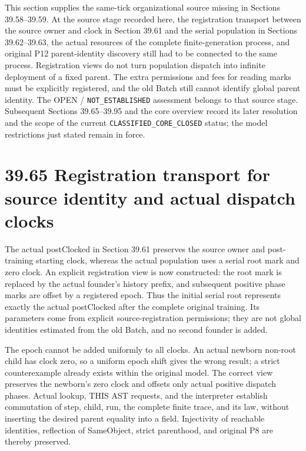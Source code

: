 \documentclass[
  english,
  11pt,
  oneside]{book}
\begin{document}
This section supplies the same-tick organizational source missing in Sections 39.58--39.59. At the source stage recorded here, the registration transport between the source owner and clock in Section 39.61 and the serial population in Sections 39.62--39.63, the actual resources of the complete finite-generation process, and original P12 parent-identity discovery still had to be connected to the same process. Registration views do not turn population dispatch into infinite deployment of a fixed parent. The extra permissions and fees for reading marks must be explicitly registered, and the old Batch still cannot identify global parent identity. The OPEN / \nolinkurl{NOT_ESTABLISHED} assessment belongs to that source stage. Subsequent Sections 39.65--39.95 and the core overview record its later resolution and the scope of the current \nolinkurl{CLASSIFIED_CORE_CLOSED} status; the model restrictions just stated remain in force.

\section{39.65 Registration transport for source identity and actual dispatch clocks}\label{registration-transport-for-source-identity-and-actual-dispatch-clocks}

The actual postClocked in Section 39.61 preserves the source owner and post-training starting clock, whereas the actual population uses a serial root mark and zero clock. An explicit registration view is now constructed: the root mark is replaced by the actual founder's history prefix, and subsequent positive phase marks are offset by a registered epoch. Thus the initial serial root represents exactly the actual postClocked after the complete original training. Its parameters come from explicit source-registration permissions; they are not global identities estimated from the old Batch, and no second founder is added.

The epoch cannot be added uniformly to all clocks. An actual newborn non-root child has clock zero, so a uniform epoch shift gives the wrong result; a strict counterexample already exists within the original model. The correct view preserves the newborn's zero clock and offsets only actual positive dispatch phases. Actual lookup, THIS AST requests, and the interpreter establish commutation of step, child, run, the complete finite trace, and its law, without inserting the desired parent equality into a field. Injectivity of reachable identities, reflection of SameObject, strict parenthood, and original P8 are thereby preserved.
\end{document}
